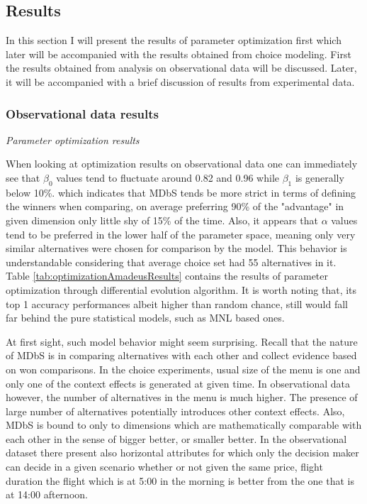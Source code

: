 \documentclass[a4paper,12pt]{article}
\begin{document}
\subsection{Results}

In this section I will present the results of parameter optimization first which later will be accompanied with the results obtained from choice modeling. First the results obtained from analysis on observational data will be discussed. Later, it will be accompanied with a brief discussion of results from experimental data.

\subsubsection{Observational data results}

\textit{Parameter optimization results}

When looking at optimization results on observational data one can immediately see that $\beta_0$ values tend to fluctuate around 0.82 and 0.96 while $\beta_1$ is generally below 10\%.  which indicates that MDbS tends be more strict in terms of defining the winners when comparing, on average preferring 90\% of the "advantage" in given dimension only little shy of 15\% of the time. Also, it appears that $\alpha$ values tend to be preferred in the lower half of the parameter space, meaning only very similar alternatives were chosen for comparison by the model. This behavior is understandable considering that average choice set had 55 alternatives in it. Table \ref{tab:optimizationAmadeusResults} contains the results of parameter optimization through differential evolution algorithm. It is worth noting that, its top 1 accuracy performances albeit higher than random chance, still would fall far behind the pure statistical models, such as MNL based ones. 

At first sight, such model behavior might seem surprising. Recall that the nature of MDbS is in comparing alternatives with each other and collect evidence based on won comparisons. In the choice experiments, usual size of the menu is one and only one of the context effects is generated at given time. In observational data however, the number of alternatives in the menu is much higher. The presence of large number of alternatives potentially introduces other context effects. Also, MDbS is bound to only to dimensions which are mathematically comparable with each other in the sense of bigger better, or smaller better. In the observational dataset there present also horizontal attributes for which only the decision maker can decide in a given scenario whether or not given the same price, flight duration the flight which is at 5:00 in the morning is better from the one that is at 14:00 afternoon.
\end{document}
